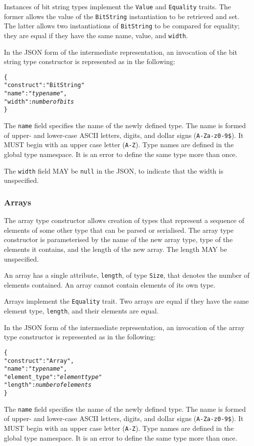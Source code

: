 \documentclass[10pt,twocolumn,a4paper]{article}
\newcommand{\code}[1]{\texttt{#1}}
\begin{document}
Instances of bit string types implement the \code{Value} and
\code{Equality} traits. The former allows the value of the \code{BitString}
instantiation to be retrieved and set. The latter allows two instantiations
of \code{BitString} to be compared for equality; they are equal if they
have the same name, value, and \code{width}.

In the JSON form of the intermediate representation, an invocation of the
bit string type constructor is represented as in the following:
\footnotesize
\begin{alltt}
  \{
    "construct"   : "BitString"
    "name"        : "\emph{type name}",
    "width"       : \emph{number of bits}
  \}
\end{alltt}
\normalsize
The \code{name} field specifies the name of the newly defined type. The
name is formed of upper- and lower-case ASCII letters, digits, and dollar
signs (\code{A-Za-z0-9\$}).  It MUST begin with an upper case letter
(\code{A-Z}). Type names are defined in the global type namespace. 
It is an error to define the same type more than once.

The \code{width} field MAY be \code{null} in the JSON, to indicate that the
width is unspecified.

\subsubsection{Arrays}

The array type constructor allows creation of types that represent a
sequence of elements of some other type that can be parsed or serialised.
The array type constructor is parameterised by the name of the new array
type, type of the elements it contains, and the length of the new array.
The length MAY be unspecified. 

An array has a single attribute, \code{length}, of type \code{Size}, that
denotes the number of elements contained. An array cannot contain elements
of its own type.

Arrays implement the \code{Equality} trait. Two arrays are equal if they
have the same element type, \code{length}, and their elements are equal.

In the JSON form of the intermediate representation, an invocation of the
array type constructor is represented as in the following:
\footnotesize
\begin{alltt}
  \{
    "construct"    : "Array",
    "name"         : "\emph{type name}",
    "element\_type" : "\emph{element type}"
    "length"       : \emph{number of elements}
  \}
\end{alltt}
\normalsize
The \code{name} field specifies the name of the newly defined type. The
name is formed of upper- and lower-case ASCII letters, digits, and dollar
signs (\code{A-Za-z0-9\$}).  It MUST begin with an upper case letter
(\code{A-Z}). Type names are defined in the global type namespace.
It is an error to define the same type more than once.
\end{document}
